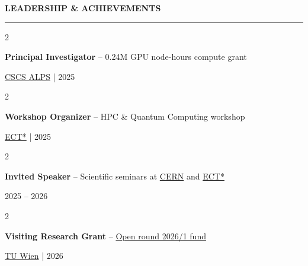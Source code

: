 \documentclass[
  18,
]{article}
\begin{document}
\begin{large}
{\bf LEADERSHIP \& ACHIEVEMENTS}
  \vspace{9pt}
  \hrule
  \vspace{9pt}

\setlength{\columnsep}{-4.5cm}

  \begin{multicols}{2}
    \begin{flushleft}    
      \textbf{Principal Investigator} -- 0.24M GPU node-hours compute grant
    \end{flushleft}
    \begin{flushright}\href{https://www.cscs.ch/computers/alps}{CSCS ALPS} | 2025\end{flushright}
  \end{multicols}

  \vspace{-0.15cm}

  \begin{multicols}{2}
    \begin{flushleft}    
      \textbf{Workshop Organizer} -- HPC \& Quantum Computing workshop
    \end{flushleft}
    \begin{flushright}\href{https://indico.ectstar.eu/event/242/}{ECT*} | 2025\end{flushright}
  \end{multicols}

  \vspace{-0.15cm}

  \begin{multicols}{2}
    \begin{flushleft}    
      \textbf{Invited Speaker} -- Scientific seminars at \href{https://indico.cern.ch/category/376/}{CERN} and \href{https://indico.ectstar.eu/event/229/contributions/5308/}{ECT*}
    \end{flushleft}
    \begin{flushright}2025 -- 2026\end{flushright}
  \end{multicols}

  \vspace{-0.15cm}  

  \begin{multicols}{2}
    \begin{flushleft}    
      \textbf{Visiting Research Grant} -- \href{https://www.philnat.unibe.ch/e17097/e95924/e1163513/e1163533/OpenRound2026_01_2_eng.pdf}{Open round 2026/1 fund}
    \end{flushleft}
    \begin{flushright}\href{https://www.tuwien.at/}{TU Wien} | 2026\end{flushright}
  \end{multicols}


\end{large}
\end{document}

